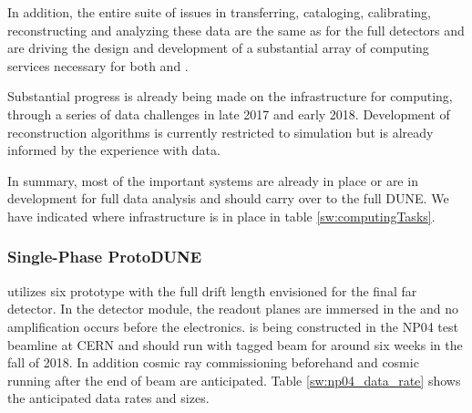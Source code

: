 In addition, the entire suite of issues in transferring, cataloging, calibrating, reconstructing and analyzing these data are the same as for the full detectors and are driving the design and development of a substantial array of computing services necessary for both  and  .

Substantial progress is already being made on the infrastructure for computing, through a series of data challenges in late 2017 and early 2018. Development of reconstruction algorithms is currently restricted to simulation but is already informed by the experience with   data.


In summary, most of the important systems are already in place or are in development for full  data analysis and should carry over to the full DUNE.
We have indicated where infrastructure is in place in  table  \ref{sw:computingTasks}.




\subsubsection{Single-Phase ProtoDUNE}

 utilizes six prototype  with the full drift length envisioned for the final far detector. In the \single detector module, the readout planes are immersed in the \lar  and no amplification occurs before the electronics.     is being constructed in the NP04 test beamline at CERN and should run with tagged  beam for around six weeks in the fall of 2018.  In addition cosmic ray commissioning beforehand and cosmic running after the end of beam are anticipated.  Table \ref{sw:np04_data_rate}
shows the anticipated data rates and sizes. 


